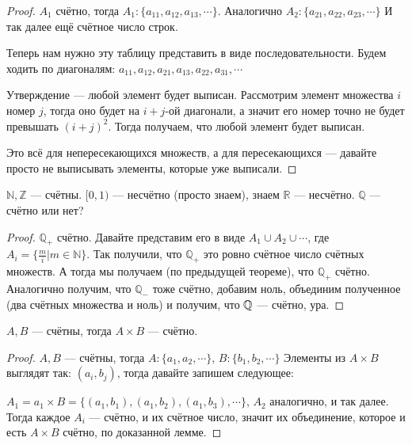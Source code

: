 \begin{proof}
	$A_1$ счётно, тогда $A_1: \{a_{11}, a_{12}, a_{13}, \cdots\}$. 
	Аналогично $A_2: \{a_{21}, a_{22}, a_{23}, \cdots\}$
	И так далее ещё счётное число строк.

	Теперь нам нужно эту таблицу представить в виде последовательности.
	Будем ходить по диагоналям: $a_{11}, a_{12}, a_{21}, a_{13}, a_{22}, a_{31}, \cdots$

	Утверждение --- любой элемент будет выписан. Рассмотрим элемент множества $i$ номер $j$, тогда оно будет на $i+j$-ой диагонали, а значит его номер точно не будет превышать $(i+j)^2$. Тогда получаем, что любой элемент будет выписан.

	Это всё для непересекающихся множеств, а для пересекающихся --- давайте просто не выписывать элементы, которые уже выписали. 
\end{proof}
\begin{exerc}
	$\mathbb{N}, \mathbb{Z}$ --- счётны. $[0, 1)$ --- несчётно (просто знаем), знаем $\mathbb{R}$ --- несчётно. $\mathbb{Q}$ --- счётно или нет?
\end{exerc}

\begin{proof}
	$\mathbb{Q}_+$ счётно. Давайте представим его в виде $A_1 \cup A_2 \cup \cdots$, где $A_i = \{\frac{m}i | m \in \mathbb{N}\}$. Так получили, что $\mathbb{Q}_+$ это ровно счётное число счётных множеств. А тогда мы получаем (по предыдущей теореме), что $\mathbb{Q}_+$ счётно. Аналогично получим, что $\mathbb{Q}_-$ тоже счётно, добавим ноль, объединим полученное (два счётных множества и ноль) и получим, что $\mathbb{Q}$ --- счётно, ура.
\end{proof}
\begin{lemma}
	$A, B$ --- счётны, тогда $A \times B$ --- счётно.
\end{lemma}
\begin{proof}
	$A, B$ --- счётны, тогда $A: \{a_1, a_2, \cdots\}$, $B: \{b_1, b_2, \cdots\}$
	Элементы из $A \times B$ выглядят так: $(a_i, b_j)$, тогда давайте запишем следующее:

	$A_1 = a_1 \times B = \{(a_1, b_1), (a_1, b_2), (a_1, b_3), \cdots\}$, $A_2$ аналогично, и так далее.
	Тогда каждое $A_i$ --- счётно, и их счётное число, значит их объединение, которое и есть $A \times B$ счётно, по доказанной лемме.
\end{proof}


